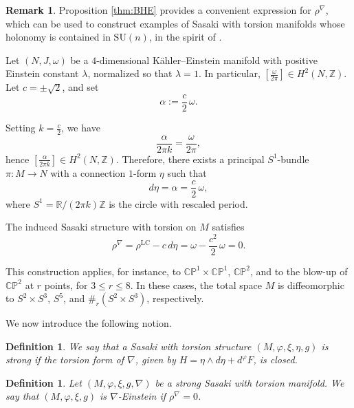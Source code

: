 \documentclass{article}
\newtheorem{defn}[thm]{Definition}
\theoremstyle{definition}
\newtheorem{rmk}[thm]{Remark}
\renewcommand{\phi}{\varphi}
\numberwithin{equation}{section}
\begin{document}
\begin{rmk}
Proposition \ref{thm:BHE} provides a convenient expression for $\rho^\nabla$, which can be used to construct examples of Sasaki with torsion manifolds whose holonomy is contained in $\mathrm{SU}(n)$, in the spirit of \cite{GGP}.

Let $(N,J,\omega)$ be a $4$-dimensional Kähler--Einstein manifold with positive Einstein constant $\lambda$, normalized so that $\lambda=1$. In particular, $[\frac{\omega}{2\pi}] \in H^2(N,\mathbb{Z})$. Let $c= \pm \sqrt{2}$, and set
\[
\alpha := \frac{c}{2}\,\omega.
\]

Setting $k = \frac{c}{2}$, we have
\[
\frac{\alpha}{2\pi k} = \frac{\omega}{2\pi},
\]
hence $\left[\frac{\alpha}{2\pi k}\right] \in H^2(N,\mathbb{Z})$. Therefore, there exists a principal $S^1$-bundle $\pi:M\to N$ with a connection $1$-form $\eta$ such that
\[
d\eta = \alpha = \frac{c}{2}\,\omega,
\]
where $S^1 = \mathbb{R}/(2\pi k)\mathbb{Z}$ is the circle with rescaled period. \par

The induced Sasaki structure with torsion on $M$ satisfies
\[
\rho^\nabla = \rho^{\mathrm{LC}} - c\, d\eta 
= \omega - \frac{c^2}{2}\,\omega = 0.
\]

This construction applies, for instance, to $\mathbb{CP}^1 \times \mathbb{CP}^1$, $\mathbb{CP}^2$, and to the blow-up of $\mathbb{CP}^2$ at $r$ points, for $3 \le r \le 8$. In these cases, the total space $M$ is diffeomorphic to $S^2 \times S^3$, $S^5$, and $\#_r(S^2 \times S^3)$, respectively.
\end{rmk}

\medskip


We now introduce the following notion.
\begin{defn}
    We say that a Sasaki with torsion structure $(M,\varphi,\xi,\eta,g)$ is strong if the torsion form of $\nabla$, given by $H=\eta\wedge d\eta+ d^{\varphi}F$, is closed.
\end{defn}

\begin{defn}
Let $(M,\phi,\xi,g, \nabla)$ be a strong Sasaki with torsion manifold. We say that $(M,\phi,\xi,g)$ is \emph{$\nabla$-Einstein} if $\rho^\nabla=0$.
\end{defn}
\end{document}
